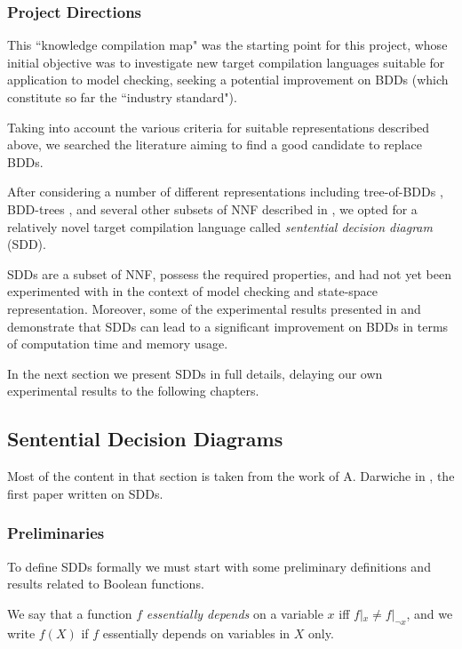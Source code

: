 \documentclass[11pt]{article}
\newenvironment{definition}[1][Definition]{\begin{trivlist}
\item[\hskip \labelsep {\bfseries #1}]}{\end{trivlist}}
\begin{document}
 
 
\subsubsection{Project Directions}

 This ``knowledge compilation map" was the starting point for this project, whose initial objective was to investigate new target compilation languages suitable for application to model checking, seeking a potential improvement on BDDs (which constitute so far the ``industry standard").

 Taking into account the various criteria for suitable representations described above, we searched the literature aiming to find a good candidate to replace BDDs. 

After considering a number of different representations including tree-of-BDDs \cite{trees_of_bdds}, BDD-trees \cite{bdd_trees}, and several other subsets of NNF described in \cite{compilation_map}, we opted for a relatively novel target compilation language called \textit{sentential decision diagram} (SDD). 

SDDs are a subset of NNF, possess the required properties, and had not yet been experimented with in the context of model checking and state-space representation. 
Moreover, some of the experimental results presented in \cite{sdd_1} and \cite{sdd_3} demonstrate that SDDs can lead to a significant improvement on BDDs in terms of computation time and memory usage. 

In the next section we present SDDs in full details, delaying our own experimental results to the following chapters.


\subsection{Sentential Decision Diagrams}

Most of the content in that section is taken from the work of A. Darwiche in \cite{sdd_1}, the first paper written on SDDs. 

\subsubsection{Preliminaries}

To define SDDs formally we must start with some preliminary definitions and results related to Boolean functions. 

\begin{definition} 
We say that a function $f$ \textit{essentially depends} on a variable $x$ iff $f|_{x} \neq f|_{\lnot x}$, and we write $f(X)$ if $f$ essentially depends on variables in $X$ only.
\end{definition}
\end{document}
